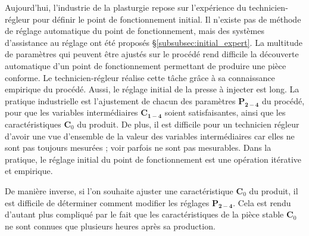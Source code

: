 Aujourd'hui, l'industrie de la plasturgie repose sur l'expérience du technicien-régleur pour définir le point de fonctionnement initial.
Il n'existe pas de méthode de réglage automatique du point de fonctionnement, mais des systèmes d'assistance au réglage ont été proposés §\ref{subsubsec:initial_expert}.
La multitude de paramètres qui peuvent être ajustés sur le procédé rend difficile la découverte automatique d'un point de fonctionnement permettant de produire une pièce conforme.
Le technicien-régleur réalise cette tâche grâce à sa connaissance empirique du procédé.
Aussi, le réglage initial de la presse à injecter est long.
La pratique industrielle est l'ajustement de chacun des paramètres $\boldsymbol{P_{2-4}}$ du procédé, pour que les variables intermédiaires $\boldsymbol{C_{1-4}}$ soient satisfaisantes, ainsi que les caractéristiques $\boldsymbol{C}_0$ du produit.
De plus, il est difficile pour un technicien régleur d'avoir une vue d'ensemble de la valeur des variables intermédiaires car elles ne sont pas toujours mesurées ; voir parfois ne sont pas mesurables.
Dans la pratique, le réglage initial du point de fonctionnement est une opération itérative et empirique.

De manière inverse, si l'on souhaite ajuster une caractéristique $\boldsymbol{C}_0$ du produit, il est difficile de déterminer comment modifier les réglages $\boldsymbol{P_{2-4}}$.
Cela est rendu d'autant plus compliqué par le fait que les caractéristiques de la pièce stable $\boldsymbol{C}_0$ ne sont connues que plusieurs heures après sa production.


